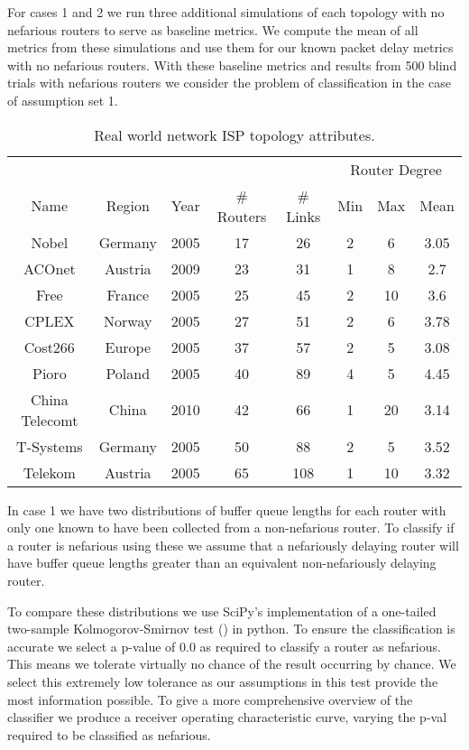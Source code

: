   For cases 1 and 2 we run three additional simulations of each topology with no nefarious routers to serve as baseline metrics. We compute the mean of all metrics from these simulations and use them for our known packet delay metrics with no nefarious routers. With these baseline metrics and results from 500 blind trials with nefarious routers we consider the problem of classification in the case of assumption set 1.\par
  \begin{table}
    \centering
    \begin{tabular}{@{}cccccccc@{}}
      \toprule
      &&&&&\multicolumn{3}{c}{Router Degree}\\
      \cmidrule{6-8}
      Name & Region & Year & \# Routers & \# Links & Min & Max & Mean \\
      \midrule
      Nobel & Germany & 2005 & 17 & 26 & 2 & 6 & 3.05\\
      ACOnet & Austria & 2009 & 23 & 31 & 1 & 8 & 2.7\\
      Free & France & 2005 & 25 & 45 & 2 & 10 & 3.6\\
      CPLEX & Norway & 2005 & 27 & 51 & 2 & 6 & 3.78\\
      Cost266 & Europe & 2005 & 37 & 57 & 2 & 5 & 3.08\\
      Pioro & Poland & 2005 & 40 & 89 & 4 & 5 & 4.45\\
      China Telecomt & China & 2010 & 42 & 66 & 1 & 20 & 3.14\\
      T-Systems & Germany & 2005 & 50 & 88 & 2 & 5 & 3.52\\
      Telekom & Austria & 2005 & 65 & 108 & 1 & 10 & 3.32\\
      \bottomrule
    \end{tabular}
    \caption{Real world network ISP topology attributes.}
    \label{tbl:Mrealnetworkattributes}
  \end{table}
  In case 1 we have two distributions of buffer queue lengths for each router with only one known to have been collected from a non-nefarious router. To classify if a router is nefarious using these we assume that a nefariously delaying router will have buffer queue lengths greater than an equivalent non-nefariously delaying router.\par
  To compare these distributions we use SciPy's implementation of a one-tailed two-sample Kolmogorov-Smirnov test (\cite{chakravarti_handbook_1967}) in python. To ensure the classification is accurate we select a p-value of 0.0 as required to classify a router as nefarious. This means we tolerate virtually no chance of the result occurring by chance. We select this extremely low tolerance as our assumptions in this test provide the most information possible. To give a more comprehensive overview of the classifier we produce a receiver operating characteristic curve, varying the p-val required to be classified as nefarious.\par
